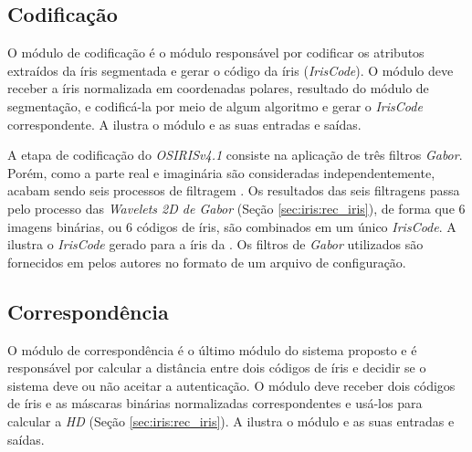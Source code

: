 \subsection{Codificação}\label{sec:metodologia:codificacao}

\par O módulo de codificação é o módulo responsável por codificar os atributos extraídos da íris segmentada e gerar o código da íris (\textit{IrisCode}). O módulo deve receber a íris normalizada em coordenadas polares, resultado do módulo de segmentação, e codificá-la por meio de algum algoritmo e gerar o \textit{IrisCode} correspondente. A  ilustra o módulo e as suas entradas e saídas.


\par A etapa de codificação do \textit{OSIRISv4.1} consiste na aplicação de três filtros \textit{Gabor}. Porém, como a parte real e imaginária são consideradas independentemente, acabam sendo seis processos de filtragem \cite{osirisv41_doc}. Os resultados das seis filtragens passa pelo processo das \textit{Wavelets 2D de Gabor} (Seção \ref{sec:iris:rec_iris}), de forma que 6 imagens binárias, ou 6 códigos de íris, são combinados em um único \textit{IrisCode}. A  ilustra o \textit{IrisCode} gerado para a íris da . Os filtros de \textit{Gabor} utilizados são fornecidos em \cite{osirisv41} pelos autores no formato de um arquivo de configuração.


\subsection{Correspondência}\label{sec:metodologia:correspondencia}

\par O módulo de correspondência é o último módulo do sistema proposto e é responsável por calcular a distância entre dois códigos de íris e decidir se o sistema deve ou não aceitar a autenticação. O módulo deve receber dois códigos de íris e as máscaras binárias normalizadas correspondentes e usá-los para calcular a \textit{\acrfull{HD}} (Seção \ref{sec:iris:rec_iris}). A  ilustra o módulo e as suas entradas e saídas.

